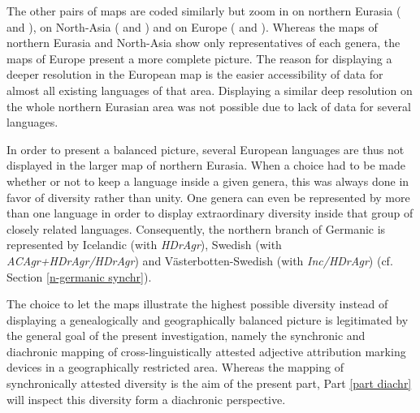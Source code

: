 The other pairs of maps are coded similarly but zoom in on northern Eurasia ( and ), on North-Asia ( and ) and on Europe ( and ). Whereas the maps of northern Eurasia and North-Asia show only representatives of each genera, the maps of Europe present a more complete picture. The reason for displaying a deeper resolution in the European map is the easier accessibility of data for almost all existing languages of that area. Displaying a similar deep resolution on the whole northern Eurasian area was not possible due to lack of data for several languages.

In order to present a balanced picture, several European languages are thus not displayed in the larger map of northern Eurasia. When a choice had to be made whether or not to keep a language inside a given genera, this was always done in favor of diversity rather than unity. One genera can even be represented by more than one language in order to display extraordinary diversity inside that group of closely related languages. Consequently, the northern branch of Germanic is represented by Icelandic (with \textit{HDrAgr}), Swedish (with \textit{ACAgr+HDrAgr/HDrAgr}) and Västerbotten-Swedish (with \textit{Inc/HDrAgr}) (cf. Section \ref{n-germanic synchr}).

The choice to let the maps illustrate the highest possible diversity instead of displaying a genealogically and geographically balanced picture is legitimated by the general goal of the present investigation, namely the synchronic and diachronic mapping of cross-linguistically attested adjective attribution marking devices in a geographically restricted area. Whereas the mapping of synchronically attested diversity is the aim of the present part, Part \ref{part diachr} will inspect this diversity form a diachronic perspective.
